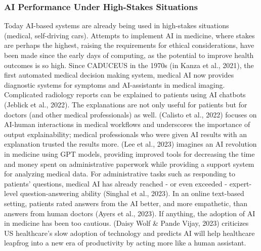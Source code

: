 \documentclass[
  letterpaper,
  DIV=11,
  numbers=noendperiod]{scrartcl}
\begin{document}
\subsubsection{AI Performance Under High-Stakes
Situations}\label{ai-performance-under-high-stakes-situations}

Today AI-based systems are already being used in high-stakes situations
(medical, self-driving cars). Attempts to implement AI in medicine,
where stakes are perhaps the highest, raising the requirements for
ethical considerations, have been made since the early days of
computing, as the potential to improve health outcomes is so high. Since
CADUCEUS in the 1970s (in Kanza et al., 2021), the first automated
medical decision making system, medical AI now provides diagnostic
systems for symptoms and AI-assistants in medical imaging. Complicated
radiology reports can be explained to patients using AI chatbots
(Jeblick et al., 2022). The explanations are not only useful for
patients but for doctors (and other medical professionals) as well.
(Calisto et al., 2022) focuses on AI-human interactions in medical
workflows and underscores the importance of output explainability;
medical professionals who were given AI results with an explanation
trusted the results more. (Lee et al., 2023) imagines an AI revolution
in medicine using GPT models, providing improved tools for decreasing
the time and money spent on administrative paperwork while providing a
support system for analyzing medical data. For administrative tasks such
as responding to patients' questions, medical AI has already reached -
or even exceeded - expert-level question-answering ability (Singhal et
al., 2023). In an online text-based setting, patients rated answers from
the AI better, and more empathetic, than answers from human doctors
(Ayers et al., 2023). If anything, the adoption of AI in medicine has
been too cautious. (Daisy Wolf \& Pande Vijay, 2023) criticizes US
healthcare's slow adoption of technology and predicts AI will help
healthcare leapfrog into a new era of productivity by acting more like a
human assistant.
\end{document}
